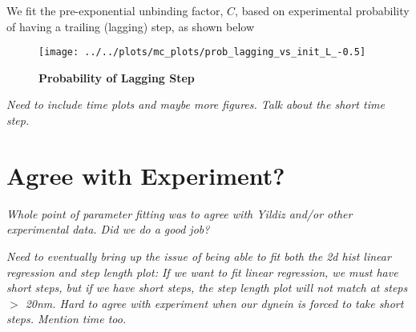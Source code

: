 We fit the pre-exponential unbinding factor, $C$, based on experimental probability of having a trailing (lagging) step, as shown below 

\begin{figure}[H]
	\centering
	\texttt{[image: ../../plots/mc\_plots/prob\_lagging\_vs\_init\_L\_-0.5]}
	\caption[Probability of Lagging Step]{\textbf{Probability of Lagging Step}}
	\label{fig:ProbTrail}
\end{figure}

\textit{Need to include time plots and maybe more figures. Talk about the short time step.}

\section{Agree with Experiment?}
\textit{Whole point of parameter fitting was to agree with Yildiz and/or other experimental data. Did we do a good job? }

\textit{Need to eventually bring up the issue of being able to fit both the 2d hist linear regression and step length plot: If we want to fit linear regression, we must have short steps, but if we have short steps, the step length plot will not match at steps $>$ 20nm. Hard to agree with experiment when our dynein is forced to take short steps. Mention time too.}